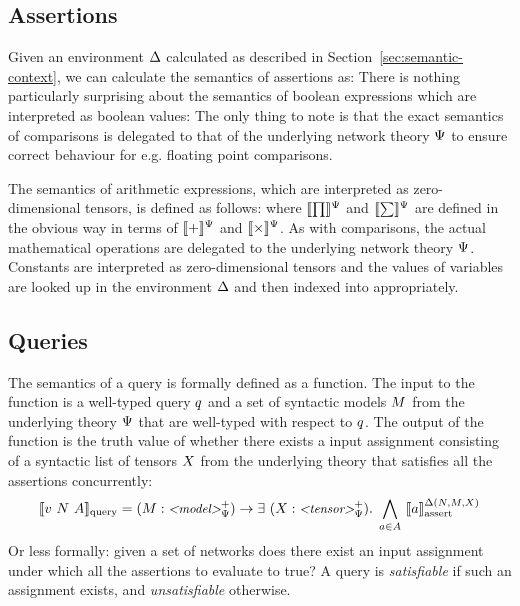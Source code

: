 \subsection{Assertions}

Given an environment $\Delta$ calculated as described in Section~\ref{sec:semantic-context}, we can calculate the semantics of assertions as: 
\unskip
There is nothing particularly surprising about the semantics of boolean expressions which are interpreted as boolean values:
\unskip
The only thing to note is that the exact semantics of comparisons is delegated to that of the underlying network theory $\Psi$ to ensure correct behaviour for e.g. floating point comparisons.

The semantics of arithmetic expressions, which are interpreted as zero-dimensional tensors, is defined as follows:
\unskip
where $\llbracket \prod \rrbracket^\Psi$ and $\llbracket \sum \rrbracket^\Psi$ are defined in the obvious way in terms of $\llbracket + \rrbracket^\Psi$ and $\llbracket \times \rrbracket^\Psi$. As with comparisons, the actual mathematical operations are delegated to the underlying network theory $\Psi$. Constants are interpreted as zero-dimensional tensors and the values of variables are looked up in the environment $\Delta$ and then indexed into appropriately.


\subsection{Queries}

The semantics of a query is formally defined as a function. The input to the function is a well-typed query $q$ and a set of syntactic models $M$ from the underlying theory $\Psi$ that are well-typed with respect to $q$. The output of the function is the truth value of whether there exists a input assignment consisting of a syntactic list of tensors $X$ from the underlying theory that satisfies all the assertions concurrently:
\begin{equation*}
\llbracket v ~ N ~ A \rrbracket_\text{query} = (M : \text{\small \textit{<model>}}_\Psi^+) \rightarrow
    \exists~(X : \text{\small \textit{<tensor>}}_\Psi^+). \; \bigwedge_{a \in A}~ 
    \llbracket a \rrbracket_\text{assert}^{\Delta(N, M,X)} \\
\end{equation*}
Or less formally: given a set of networks does there exist an input assignment under which all the assertions to evaluate to true?
A query is \textit{satisfiable} if such an assignment exists, and \textit{unsatisfiable} otherwise.


